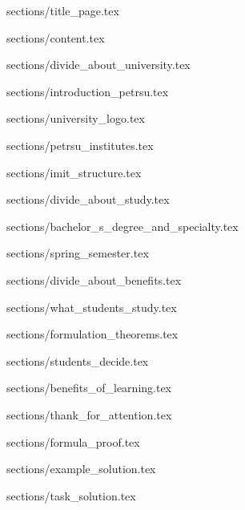 \documentclass[aspectratio=169, hyperref={unicode}]{beamer}
\begin{document}
{sections/title_page.tex}

{sections/content.tex}

{sections/divide_about_university.tex}

{sections/introduction_petrsu.tex}

{sections/university_logo.tex}

{sections/petrsu_institutes.tex}

{sections/imit_structure.tex}

{sections/divide_about_study.tex}

{sections/bachelor_s_degree_and_specialty.tex}

{sections/spring_semester.tex}

{sections/divide_about_benefits.tex}

{sections/what_students_study.tex}

{sections/formulation_theorems.tex}

{sections/students_decide.tex}

{sections/benefits_of_learning.tex}

{sections/thank_for_attention.tex}

{sections/formula_proof.tex}

{sections/example_solution.tex}

{sections/task_solution.tex}
\end{document}
